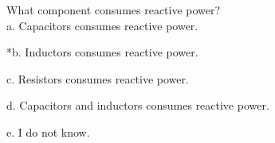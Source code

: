 
What component consumes reactive power?\\

a. Capacitors consumes reactive power.

*b. Inductors consumes reactive power.

c. Resistors consumes reactive power.

d. Capacitors and inductors consumes reactive power.

e. I do not know.\\
